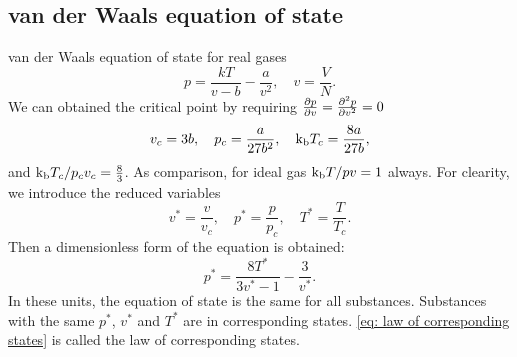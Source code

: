 \documentclass[10pt]{article}
\begin{document}
	\subsection{van der Waals equation of state}

	van der Waals equation of state for real gases
	\begin{equation}
		p = \frac{k T}{v - b} - \frac{a}{v^2}, \quad v = \frac{V}{N}.
	\end{equation}
	We can obtained the critical point by requiring $\pdv{p}{v} = \pdv[2]{p}{v} = 0$
	\begin{equation}
		v_c = 3b, \quad p_c = \frac{a}{27b^2}, \quad {\mathrm{k_b}} T_c = \frac{8a}{27b},
	\end{equation}
	and ${\mathrm{k_b}} T_c / p_c v_c = \frac{8}{3}$. As comparison, for ideal gas ${\mathrm{k_b}} T / p v = 1$ always. For clearity, we  introduce the reduced variables
	\begin{equation}
		v^* = \frac{v}{v_c}, \quad p^* = \frac{p}{p_c}, \quad T^* = \frac{T}{T_c}.
	\end{equation}
	Then a dimensionless form of the equation is obtained:
	\begin{equation}
		p^* = \frac{8T^*}{3v^* - 1} - \frac{3}{v^*}. \label{eq: law of corresponding states}
	\end{equation}
	In these units, the equation of state is the same for all substances. Substances with the same $p^*$, $v^*$ and $T^*$ are in corresponding states. \eqref{eq: law of corresponding states} is called the law of corresponding states.
\end{document}
